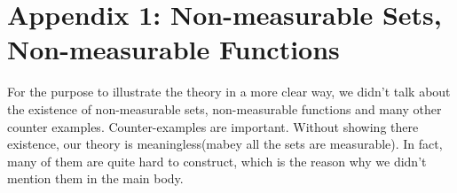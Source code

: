 \documentclass[lang=en, 12pt]{elegantbook}
\begin{document}
\chapter{Appendix 1: Non-measurable Sets, Non-measurable Functions}
    For the purpose to illustrate the theory in a more clear way, we didn't talk about the existence of non-measurable sets, non-measurable functions and many 
other counter examples. Counter-examples are important. Without showing there existence, our theory is meaningless(mabey all the sets are 
measurable). In fact, many of them are quite hard to construct, which is the reason why we didn't mention them in the main body. 
\end{document}
